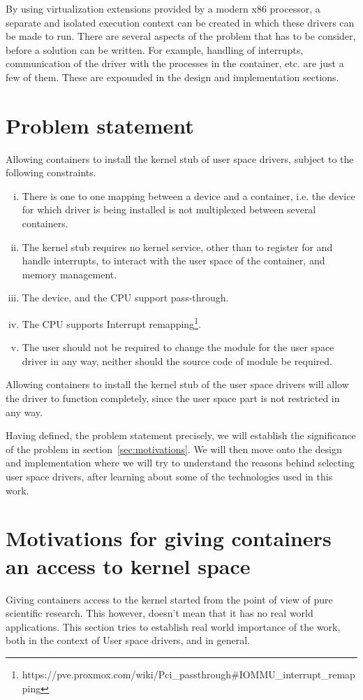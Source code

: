 \documentclass[twoside]{iitbreport}
\begin{document}
By using virtualization extensions provided by a modern x86 processor, a separate and isolated execution context can be created in which these drivers can be made to run. There are several aspects of the problem that has to be consider, before a solution can be written. For example, handling of interrupts, communication of the driver with the processes in the container, etc. are just a few of them. These are expounded in the design and implementation sections.

\section{Problem statement\label{sec:problemstatement1}}

Allowing containers to install the kernel stub of user space drivers, subject to the following constraints.

\begin{enumerate}[(i)]
\item There is one to one mapping between a device and a container, i.e. the device for which driver is being installed is not multiplexed between several containers.
\item The kernel stub requires no kernel service, other than to register for and handle interrupts, to interact with the user space of the container, and memory management.
\item The device, and the CPU support pass-through. 
\item The CPU supports Interrupt remapping\footnote{https://pve.proxmox.com/wiki/Pci\_passthrough\#IOMMU\_interrupt\_remapping}.
\item The user should not be required to change the module for the user space driver in any way, neither should the source code of module be required.
\end{enumerate}

Allowing containers to install the kernel stub of the user space drivers will allow the driver to function completely, since the user space part is not  restricted in any way. 

Having defined, the problem statement precisely, we will establish the significance of the problem in section~\ref{sec:motivations}. We will then move onto the design and implementation where we will try to understand the reasons behind selecting user space drivers, after learning about some of the technologies used in this work.

\section{Motivations for giving containers an access to kernel space \label{sec:motivations}}
Giving containers access to the kernel started from the point of view of pure scientific research. This however, doesn't mean that it has no real world applications. This section tries to establish real world importance of the work, both in the context of User space drivers, and in general.
\end{document}
